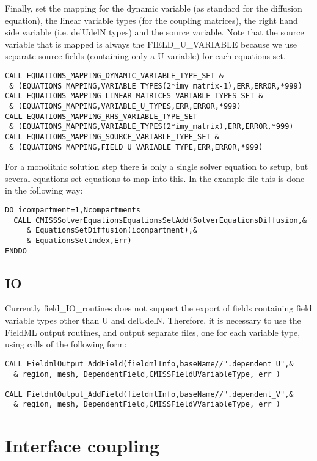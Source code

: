 Finally, set the mapping for the dynamic variable (as standard for the diffusion equation), the linear variable types (for the coupling matrices), the right hand side variable (i.e. delUdelN types) and the source variable. Note that the source variable that is mapped is always the FIELD\_U\_VARIABLE because we use separate source fields (containing only a U variable) for each equations set.

\begin{lstlisting}
CALL EQUATIONS_MAPPING_DYNAMIC_VARIABLE_TYPE_SET &
 & (EQUATIONS_MAPPING,VARIABLE_TYPES(2*imy_matrix-1),ERR,ERROR,*999)
CALL EQUATIONS_MAPPING_LINEAR_MATRICES_VARIABLE_TYPES_SET &
 & (EQUATIONS_MAPPING,VARIABLE_U_TYPES,ERR,ERROR,*999)
CALL EQUATIONS_MAPPING_RHS_VARIABLE_TYPE_SET
 & (EQUATIONS_MAPPING,VARIABLE_TYPES(2*imy_matrix),ERR,ERROR,*999)
CALL EQUATIONS_MAPPING_SOURCE_VARIABLE_TYPE_SET &
 & (EQUATIONS_MAPPING,FIELD_U_VARIABLE_TYPE,ERR,ERROR,*999)
\end{lstlisting}

For a monolithic solution step there is only a single solver equation to setup, but several equations set equations to map into this. In the example file this is done in the following way:

\begin{lstlisting}
DO icompartment=1,Ncompartments
  CALL CMISSSolverEquationsEquationsSetAdd(SolverEquationsDiffusion,&
     & EquationsSetDiffusion(icompartment),&
     & EquationsSetIndex,Err)
ENDDO 
\end{lstlisting}

\subsection{IO}

Currently field\_IO\_routines does not support the export of fields containing field variable types other than U and delUdelN. Therefore, it is necessary to use the FieldML output routines, and output separate files, one for each variable type, using calls of the following form:

\begin{lstlisting}
CALL FieldmlOutput_AddField(fieldmlInfo,baseName//".dependent_U",&
  & region, mesh, DependentField,CMISSFieldUVariableType, err )

CALL FieldmlOutput_AddField(fieldmlInfo,baseName//".dependent_V",&
  & region, mesh, DependentField,CMISSFieldVVariableType, err ) 
\end{lstlisting}




\section{Interface coupling}
